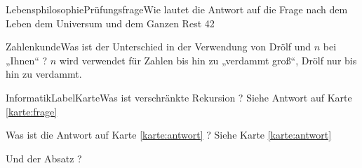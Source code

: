 \documentclass[print,a6paper]{kartei}
\begin{document}
	
	\begin{karte}{Lebensphilosophie}{Prüfungsfrage}{Wie lautet die Antwort auf die Frage nach dem Leben dem Universum und dem Ganzen Rest}
	42
	\end{karte}
	
	\begin{karte}{Zahlenkunde}{}{Was ist der Unterschied in der Verwendung von Drölf und $n$ bei „Ihnen“ ?}
	$n$ wird verwendet für Zahlen bis hin zu „verdammt groß“, Drölf nur bis hin zu verdammt.
	\end{karte}

	\begin{karte}{Informatik}{LabelKarte}{Was ist verschränkte Rekursion ?}
	\label{karte:antwort} Siehe Antwort auf Karte \ref{karte:frage}
	\end{karte}

	\begin{karte}{}{}{Was ist die Antwort auf Karte \ref{karte:antwort} ?}
		\label{karte:frage} Siehe Karte \ref{karte:antwort}
		
		Und der Absatz ? 
	\end{karte}
\end{document}
